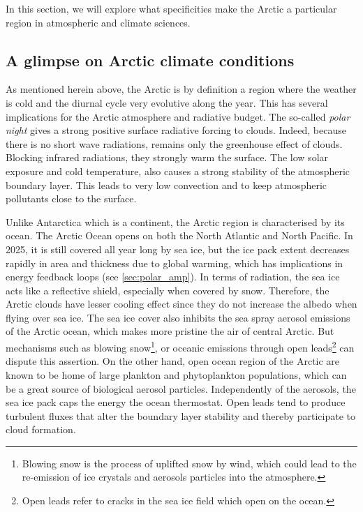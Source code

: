 In this section, we will explore what specificities make the Arctic a particular region in atmospheric and climate sciences.

    \subsection{A glimpse on Arctic climate conditions}
    \label{sec:arctic_glimpse} 
    As mentioned herein above, the Arctic is by definition a region where the weather is cold and the diurnal cycle very evolutive along the year. This has several implications for the Arctic atmosphere and radiative budget.
    The so-called \textit{polar night} gives a strong positive surface radiative forcing to clouds. Indeed, because there is no short wave radiations, remains only the greenhouse effect of clouds. Blocking infrared radiations, they strongly warm the surface.
    The low solar exposure and cold temperature, also causes a strong stability of the atmospheric boundary layer. This leads to very low convection and to keep atmospheric pollutants close to the surface.

    Unlike Antarctica which is a continent, the Arctic region is characterised by its ocean. 
    The Arctic Ocean opens on both the North Atlantic and North Pacific. In 2025, it is still covered all year long by sea ice, but the ice pack extent decreases rapidly in area and thickness due to global warming, which has implications in energy feedback loops (see \cref{sec:polar_amp}). 
    In terms of radiation, the sea ice acts like a reflective shield, especially when covered by snow. Therefore, the Arctic clouds have lesser cooling effect since they do not increase the albedo when flying over sea ice.
    The sea ice cover also inhibits the sea spray aerosol emissions of the Arctic ocean, which makes more pristine the air of central Arctic. But mechanisms such as blowing snow\footnote{Blowing snow is the process of uplifted snow by wind, which could lead to the re-emission of ice crystals and aerosols particles into the atmosphere.}, or oceanic emissions through open leads\footnote{Open leads refer to cracks in the sea ice field which open on the ocean.} can dispute this assertion.
    On the other hand, open ocean region of the Arctic are known to be home of large plankton and phytoplankton populations, which can be a great source of biological aerosol particles.
    Independently of the aerosols, the sea ice pack caps the energy the  ocean thermostat. Open leads tend to produce turbulent fluxes that alter the boundary layer stability and thereby participate to cloud formation.

